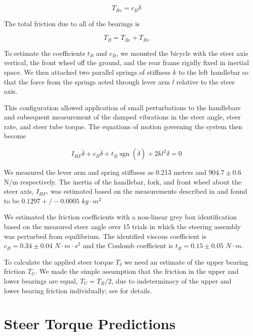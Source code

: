 \documentclass[10pt]{article}
\begin{document}
\begin{equation}
  \label{eq:viscous}
  T_{Bv} = c_B \dot{\delta}
\end{equation}

The total friction due to all of the bearings is

\begin{equation}
  T_B = T_{Bc} + T_{Bv}
\end{equation}

To estimate the coefficients $t_B$ and $c_B$, we mounted the bicycle with the
steer axis vertical, the front wheel off the ground, and the rear frame rigidly
fixed in inertial space. We then attached two parallel springs of stiffness $k$
to the left handlebar so that the force from the springs acted through lever
arm $l$ relative to the steer axis.

This configuration allowed application of small perturbations to the handlebars
and subsequent measurement of the damped vibrations in the steer angle, steer
rate, and steer tube torque. The equations of motion governing the system then
become

\begin{equation}
  I_{HF} \ddot{\delta} + c_B \dot{\delta} + t_B
  \operatorname{sgn}(\dot{\delta}) + 2 k l^2 \delta = 0
\end{equation}

We measured the lever arm and spring stiffness as 0.213 meters and $904.7 \pm
0.6$ N/m respectively. The inertia of the handlebar, fork, and front wheel
about the steer axis, $I_{HF}$, was estimated based on the measurements
described in \cite{Moore2012} and found to be $0.1297+/-0.0005$ $kg\cdot m^2$

We estimated the friction coefficients with a non-linear grey box
identification based on the measured steer angle over 15 trials in which the
steering assembly was perturbed from equilibrium. The identified viscous
coefficient is $c_B = 0.34 \pm 0.04$ $N \cdot m \cdot s^2$ and the Coulomb
coefficient is $t_B = 0.15 \pm 0.05$ $N \cdot m$.

To calculate the applied steer torque $T_\delta$ we need an estimate of the
upper bearing friction $T_U$. We made the simple assumption that the friction
in the upper and lower bearings are equal, $T_U = T_B / 2$, due to
indeterminacy of the upper and lower bearing friction individually; see
\cite{Moore2012} for details.

\section*{Steer Torque Predictions}
\end{document}
